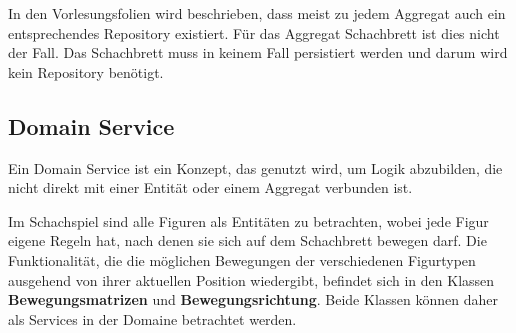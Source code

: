 In den Vorlesungsfolien wird beschrieben, dass meist zu jedem Aggregat auch ein entsprechendes Repository existiert. 
Für das Aggregat Schachbrett ist dies nicht der Fall. 
Das Schachbrett muss in keinem Fall persistiert werden und darum wird kein Repository benötigt. 

\subsection*{Domain Service}

Ein Domain Service ist ein Konzept, das genutzt wird, um Logik abzubilden, die nicht direkt mit einer Entität oder einem Aggregat verbunden ist.

Im Schachspiel sind alle Figuren als Entitäten zu betrachten, wobei jede Figur eigene Regeln hat, nach denen sie sich auf dem Schachbrett bewegen darf.
Die Funktionalität, die die möglichen Bewegungen der verschiedenen Figurtypen ausgehend von ihrer aktuellen Position wiedergibt, befindet sich in den Klassen \textbf{Bewegungsmatrizen} und \textbf{Bewegungsrichtung}.
Beide Klassen können daher als Services in der Domaine betrachtet werden.
